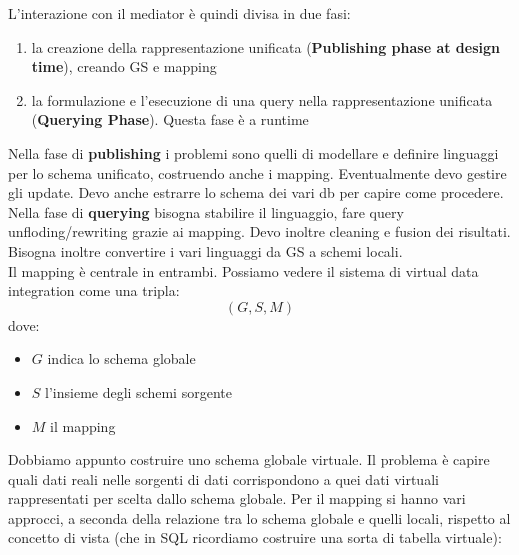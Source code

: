 \documentclass[a4paper,12pt, oneside]{book}
\begin{document}
L'interazione con il mediator è quindi divisa in due fasi:
\begin{enumerate}
  \item la creazione della rappresentazione unificata (\textbf{Publishing phase
    at design time}), creando GS e mapping
  \item la formulazione e l'esecuzione di una query nella rappresentazione
  unificata (\textbf{Querying Phase}). Questa fase è a runtime
\end{enumerate}
Nella fase di \textbf{publishing} i problemi sono quelli di modellare e definire
linguaggi 
per lo schema unificato, costruendo anche i mapping. Eventualmente devo gestire
gli update. Devo anche estrarre lo schema dei vari db per capire come
procedere.\\
Nella fase di \textbf{querying} bisogna stabilire il linguaggio, fare query
unfloding/rewriting grazie ai mapping. Devo inoltre cleaning e fusion dei
risultati. Bisogna inoltre convertire i vari linguaggi da GS a schemi locali.\\
Il mapping è centrale in entrambi. Possiamo vedere il sistema di virtual data
integration come una tripla:
\[(G,S,M)\]
dove:
\begin{itemize}
  \item $G$ indica lo schema globale
  \item $S$ l'insieme degli schemi sorgente
  \item $M$ il mapping
\end{itemize}
Dobbiamo appunto costruire uno schema globale virtuale. Il problema è capire
quali dati reali nelle sorgenti di dati corrispondono a quei dati virtuali
rappresentati per scelta dallo schema globale. Per il mapping si hanno vari
approcci, a seconda della relazione tra lo schema globale e quelli locali,
rispetto al concetto di vista (che in SQL ricordiamo costruire una sorta di
tabella virtuale):
\end{document}
